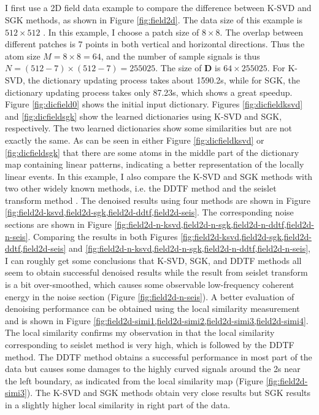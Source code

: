 \subsection{}
I first use a 2D field data example to compare the difference between K-SVD and SGK methods, as shown in Figure \ref{fig:field2d}.  The data size of this example is $512\times 512$ . In this example, I choose a patch size of $8\times8$. The overlap between different patches is $7$ points in both vertical and horizontal directions. Thus the atom size $M=8\times8=64$, and the number of sample signals is thus $N=(512-7)\times(512-7)=255025$. The size of $\mathbf{D}$ is $64\times255025$. For K-SVD, the dictionary updating process takes about 1590.2s, while for SGK, the dictionary updating process takes only 87.23s, which shows a great speedup. Figure \ref{fig:dicfield0} shows the initial input dictionary. Figures \ref{fig:dicfieldksvd} and \ref{fig:dicfieldsgk} show the learned dictionaries using K-SVD and SGK, respectively. The two learned dictionaries show some similarities but are not exactly the same. As can be seen in either Figure \ref{fig:dicfieldksvd} or \ref{fig:dicfieldsgk} that there are some atoms in the middle part of the dictionary map containing linear patterns, indicating a better representation of the locally linear events. In this example, I also compare the K-SVD and SGK methods with two other widely known methods, i.e. the DDTF method \cite[]{jianfeng2013} and the seislet transform method \cite[]{fomel2010seislet}. The denoised results using four methods are shown in Figure \ref{fig:field2d-ksvd,field2d-sgk,field2d-ddtf,field2d-seis}. The corresponding noise sections are shown in Figure \ref{fig:field2d-n-ksvd,field2d-n-sgk,field2d-n-ddtf,field2d-n-seis}. Comparing the results in both Figures \ref{fig:field2d-ksvd,field2d-sgk,field2d-ddtf,field2d-seis} and \ref{fig:field2d-n-ksvd,field2d-n-sgk,field2d-n-ddtf,field2d-n-seis}, I can roughly get some conclusions that K-SVD, SGK, and DDTF methods all seem to obtain successful denoised results while the result from seislet transform is a bit over-smoothed, which causes some observable low-frequency coherent energy in the noise section (Figure \ref{fig:field2d-n-seis}). A better evaluation of denoising performance can be obtained using the local similarity measurement and is shown in Figure \ref{fig:field2d-simi1,field2d-simi2,field2d-simi3,field2d-simi4}. The local similarity confirms my observation in that the local similarity corresponding to seislet method is very high, which is followed by the DDTF method. The DDTF method obtains a successful performance in most part of the data but causes some damages to the highly curved signals around the 2s near the left boundary, as indicated from the local similarity map (Figure \ref{fig:field2d-simi3}). The K-SVD and SGK methods obtain very close results but SGK results in a slightly higher local similarity in right part of the data.  

